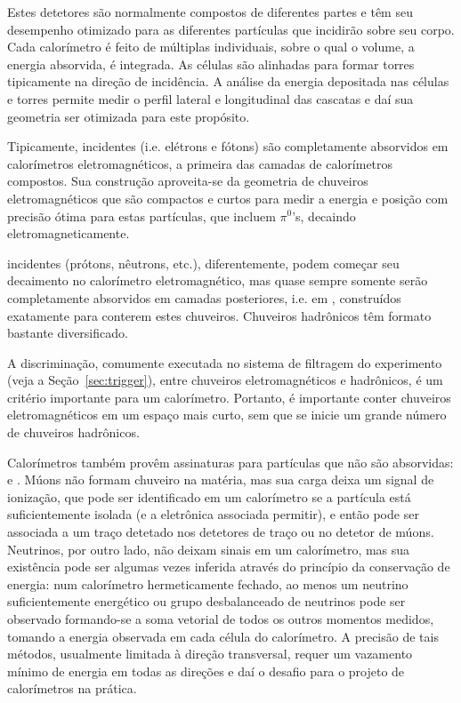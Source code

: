 Estes detetores são normalmente compostos de diferentes partes e têm seu
desempenho otimizado para as diferentes partículas que incidirão sobre seu
corpo. Cada calorímetro é feito de múltiplas  individuais, sobre
o qual o volume, a energia absorvida, é integrada. As células são alinhadas
para formar torres tipicamente na direção de incidência. A análise da energia
depositada nas células e torres permite medir o perfil lateral e longitudinal
das cascatas e daí sua geometria ser otimizada para este propósito.

Tipicamente,  incidentes (i.e. elétrons e
fótons) são completamente absorvidos em calorímetros eletromagnéticos, a
primeira das camadas de calorímetros compostos. Sua construção aproveita-se da
geometria de chuveiros eletromagnéticos que são compactos e curtos para medir
a energia e posição com precisão ótima para estas partículas, que incluem
$\pi^{0}$'s, decaindo eletromagneticamente.

 incidentes (prótons, nêutrons, etc.), diferentemente,
podem começar seu decaimento no calorímetro eletromagnético, mas quase sempre
somente serão completamente absorvidos em camadas posteriores, i.e. em
, construídos exatamente para conterem estes
chuveiros. Chuveiros hadrônicos têm formato bastante diversificado.

A discriminação, comumente executada no sistema de filtragem do experimento
(veja a Seção~\ref{sec:trigger}), entre chuveiros eletromagnéticos e
hadrônicos, é um critério importante para um calorímetro. Portanto, é
importante conter chuveiros eletromagnéticos em um espaço mais curto, sem que
se inicie um grande número de chuveiros hadrônicos.

Calorímetros também provêm assinaturas para partículas que não são absorvidas:
 e . Múons não formam chuveiro na matéria, mas sua
carga deixa um signal de ionização, que pode ser identificado em um
calorímetro se a partícula está suficientemente isolada (e a eletrônica
associada permitir), e então pode ser associada a um traço detetado nos
detetores de traço ou no detetor de múons. Neutrinos, por outro lado, não
deixam sinais em um calorímetro, mas sua existência pode ser algumas vezes
inferida através do princípio da conservação de energia: num calorímetro
hermeticamente fechado, ao menos um neutrino suficientemente energético ou
grupo desbalanceado de neutrinos pode ser observado formando-se a soma
vetorial de todos os outros momentos medidos, tomando a energia observada em
cada célula do calorímetro. A precisão de tais métodos, usualmente limitada à
direção transversal, requer um vazamento mínimo de energia em todas as
direções e daí o desafio para o projeto de calorímetros na prática.

